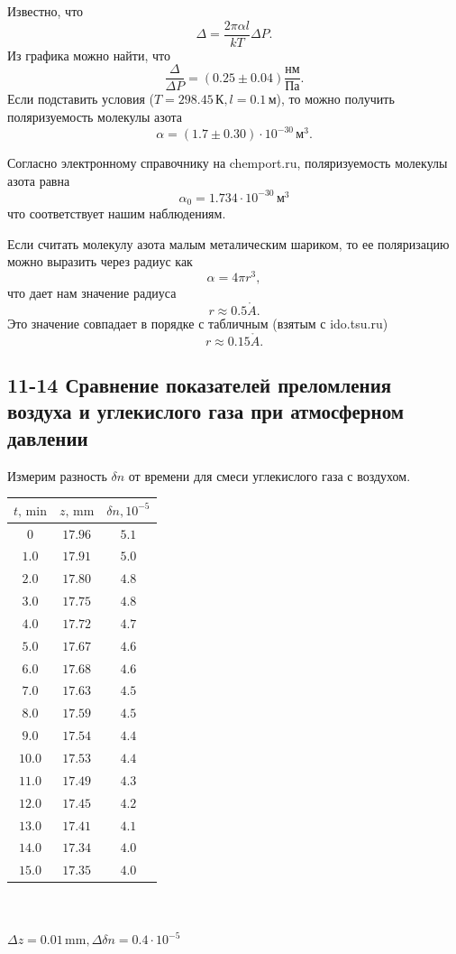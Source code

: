 \documentclass[a4paper,12pt]{article}
\renewcommand{\AA}{\ensuremath{\mathring{A}}}
\begin{document}
Известно, что
\[\Delta = \frac{2\pi\alpha l}{kT}\Delta P.\]
Из графика можно найти, что
\[\frac{\Delta}{\Delta P} = (0.25 \pm 0.04)\frac{\text{нм}}{\text{Па}}.\]
Если подставить условия ($T=298.45\,\text{К}, l=0.1\,\text{м}$), то можно получить поляризуемость молекулы азота
\[\alpha = (1.7\pm0.30) \cdot 10^{-30}\,\text{м}^3.\]

Согласно электронному справочнику на chemport.ru, поляризуемость молекулы азота равна
\[\alpha_0 = 1.734 \cdot 10^{-30}\,\text{м}^3\]
что соответствует нашим наблюдениям.

Если считать молекулу азота малым металическим шариком, то ее поляризацию можно выразить через радиус как
\[\alpha = 4 \pi r^3,\]
что дает нам значение радиуса
\[r \approx 0.5 \AA.\]
Это значение совпадает в порядке с табличным (взятым с ido.tsu.ru)
\[r \approx 0.15 \AA.\]
\subsection*{11-14 Сравнение показателей преломления воздуха и углекислого газа при атмосферном давлении}

Измерим разность $\delta n$ от времени для смеси углекислого газа с воздухом.

\begin{center}
\begin{tabular}{|c|c|c|}\hline
$t\text{, min}$&$z\text{, mm}$&$\delta n, 10^{-5}$\\\hline
$0$&$17.96$&$5.1$\\\hline
$1.0$&$17.91$&$5.0$\\\hline
$2.0$&$17.80$&$4.8$\\\hline
$3.0$&$17.75$&$4.8$\\\hline
$4.0$&$17.72$&$4.7$\\\hline
$5.0$&$17.67$&$4.6$\\\hline
$6.0$&$17.68$&$4.6$\\\hline
$7.0$&$17.63$&$4.5$\\\hline
$8.0$&$17.59$&$4.5$\\\hline
$9.0$&$17.54$&$4.4$\\\hline
$10.0$&$17.53$&$4.4$\\\hline
$11.0$&$17.49$&$4.3$\\\hline
$12.0$&$17.45$&$4.2$\\\hline
$13.0$&$17.41$&$4.1$\\\hline
$14.0$&$17.34$&$4.0$\\\hline
$15.0$&$17.35$&$4.0$\\\hline
\end{tabular}\\~\\
$\Delta z=0.01\,\text{mm}, \Delta \delta n=0.4\cdot10^{-5}$
\end{center}
\end{document}
